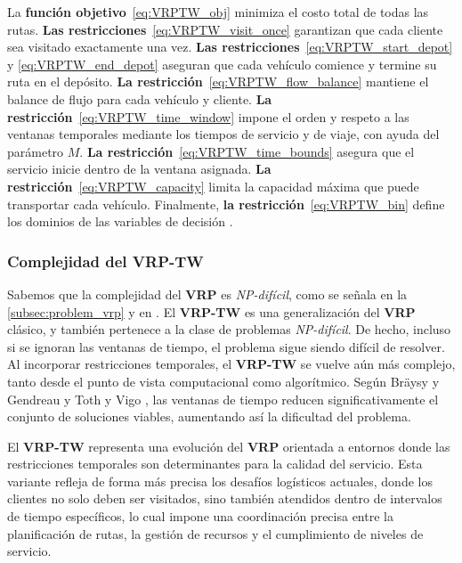 \documentclass[12pt,titlepage,twoside,openright]{book}
\begin{document}
La \textbf{función objetivo}~\eqref{eq:VRPTW_obj} minimiza el costo total de todas las rutas. \textbf{Las restricciones}~\eqref{eq:VRPTW_visit_once} garantizan que cada cliente sea visitado exactamente una vez. \textbf{Las restricciones}~\eqref{eq:VRPTW_start_depot} y \eqref{eq:VRPTW_end_depot} aseguran que cada vehículo comience y termine su ruta en el depósito. \textbf{La restricción}~\eqref{eq:VRPTW_flow_balance} mantiene el balance de flujo para cada vehículo y cliente. \textbf{La restricción}~\eqref{eq:VRPTW_time_window} impone el orden y respeto a las ventanas temporales mediante los tiempos de servicio y de viaje, con ayuda del parámetro \(M\). \textbf{La restricción}~\eqref{eq:VRPTW_time_bounds} asegura que el servicio inicie dentro de la ventana asignada. \textbf{La restricción}~\eqref{eq:VRPTW_capacity} limita la capacidad máxima que puede transportar cada vehículo. Finalmente, \textbf{la restricción}~\eqref{eq:VRPTW_bin} define los dominios de las variables de decisión \citep{toth2014}.

\subsubsection*{Complejidad del VRP-TW}

Sabemos que la complejidad del \textbf{VRP} es \textit{NP-difícil}, como se señala en la \autoref{subsec:problem_vrp} y en \citep{laporte1987}. El \textbf{VRP-TW} es una generalización del \textbf{VRP} clásico, y también pertenece a la clase de problemas \textit{NP-difícil}. De hecho, incluso si se ignoran las ventanas de tiempo, el problema sigue siendo difícil de resolver. Al incorporar restricciones temporales, el \textbf{VRP-TW} se vuelve aún más complejo, tanto desde el punto de vista computacional como algorítmico. Según Bräysy y Gendreau \citep{braysy2005} y Toth y Vigo \citep{toth2014}, las ventanas de tiempo reducen significativamente el conjunto de soluciones viables, aumentando así la dificultad del problema.


El \textbf{VRP-TW} representa una evolución del \textbf{VRP} orientada a entornos donde las restricciones temporales son determinantes para la calidad del servicio. Esta variante refleja de forma más precisa los desafíos logísticos actuales, donde los clientes no solo deben ser visitados, sino también atendidos dentro de intervalos de tiempo específicos, lo cual impone una coordinación precisa entre la planificación de rutas, la gestión de recursos y el cumplimiento de niveles de servicio.
\end{document}
